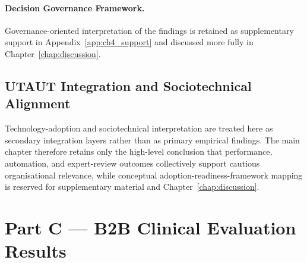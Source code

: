 \paragraph{Decision Governance Framework.}

Governance-oriented interpretation of the findings is retained as supplementary support in Appendix~\ref{app:ch4_support} and discussed more fully in Chapter~\ref{chap:discussion}.


\subsection{UTAUT Integration and Sociotechnical Alignment}

Technology-adoption and sociotechnical interpretation are treated here as secondary integration layers rather than as primary empirical findings. The main chapter therefore retains only the high-level conclusion that performance, automation, and expert-review outcomes collectively support cautious organisational relevance, while conceptual adoption-readiness-framework mapping is reserved for supplementary material and Chapter~\ref{chap:discussion}.

\section{Part C --- B2B Clinical Evaluation Results}
\label{sec:ch4_part_c}

